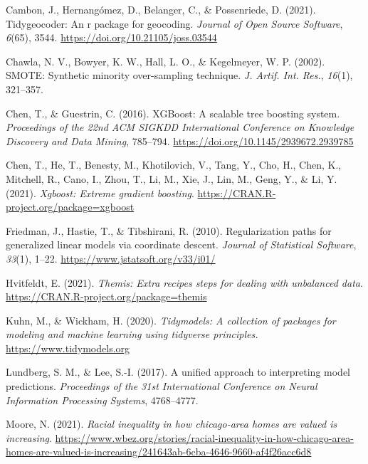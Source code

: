 \documentclass[
  12pt,
]{article}
\newlength{\cslhangindent}
\newlength{\cslentryspacingunit} %
\newenvironment{CSLReferences}[2] %
 {%
  \setlength{\parindent}{0pt}
  \ifodd #1
  \let\oldpar\par
  \def\par{\hangindent=\cslhangindent\oldpar}
  \fi
  \setlength{\parskip}{#2\cslentryspacingunit}
 }%
 {}
\begin{document}
\hypertarget{refs}{}
\begin{CSLReferences}{1}{0}
\leavevmode{}%
Cambon, J., Hernangómez, D., Belanger, C., \& Possenriede, D. (2021).
Tidygeocoder: An r package for geocoding. \emph{Journal of Open Source
Software}, \emph{6}(65), 3544. \url{https://doi.org/10.21105/joss.03544}

\leavevmode{}%
Chawla, N. V., Bowyer, K. W., Hall, L. O., \& Kegelmeyer, W. P. (2002).
SMOTE: Synthetic minority over-sampling technique. \emph{J. Artif. Int.
Res.}, \emph{16}(1), 321--357.

\leavevmode{}%
Chen, T., \& Guestrin, C. (2016). XGBoost: A scalable tree boosting
system. \emph{Proceedings of the 22nd ACM SIGKDD International
Conference on Knowledge Discovery and Data Mining}, 785--794.
\url{https://doi.org/10.1145/2939672.2939785}

\leavevmode{}%
Chen, T., He, T., Benesty, M., Khotilovich, V., Tang, Y., Cho, H., Chen,
K., Mitchell, R., Cano, I., Zhou, T., Li, M., Xie, J., Lin, M., Geng,
Y., \& Li, Y. (2021). \emph{Xgboost: Extreme gradient boosting}.
\url{https://CRAN.R-project.org/package=xgboost}

\leavevmode{}%
Friedman, J., Hastie, T., \& Tibshirani, R. (2010). Regularization paths
for generalized linear models via coordinate descent. \emph{Journal of
Statistical Software}, \emph{33}(1), 1--22.
\url{https://www.jstatsoft.org/v33/i01/}

\leavevmode{}%
Hvitfeldt, E. (2021). \emph{Themis: Extra recipes steps for dealing with
unbalanced data}. \url{https://CRAN.R-project.org/package=themis}

\leavevmode{}%
Kuhn, M., \& Wickham, H. (2020). \emph{Tidymodels: A collection of
packages for modeling and machine learning using tidyverse principles.}
\url{https://www.tidymodels.org}

\leavevmode{}%
Lundberg, S. M., \& Lee, S.-I. (2017). A unified approach to
interpreting model predictions. \emph{Proceedings of the 31st
International Conference on Neural Information Processing Systems},
4768--4777.

\leavevmode{}%
Moore, N. (2021). \emph{Racial inequality in how chicago-area homes are
valued is increasing}.
\url{https://www.wbez.org/stories/racial-inequality-in-how-chicago-area-homes-are-valued-is-increasing/241643ab-6cba-4646-9660-af4f26acc6d8}


\end{CSLReferences}
\end{document}
